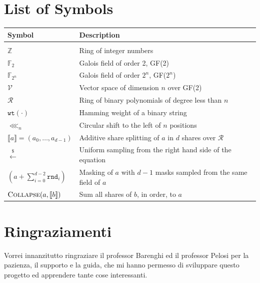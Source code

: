 \documentclass{Configuration_Files/PoliMi3i_thesis}
\theoremstyle{definition}
\theoremstyle{remark}
\newcommand{\sample}{\ensuremath{ \stackrel{\$}{\gets} }}
\newcommand{\ssplit}[1]{\ensuremath{ \llbracket #1 \rrbracket }}
\newcommand{\clshift}{\ensuremath{\lll_n}}
\begin{document}
\listoffigures

\listoftables

\listofalgorithms
\lstlistoflistings

\chapter*{List of Symbols} %
\begin{table}[H]
    \centering
    \begin{tabular}{ll}
        \textbf{Symbol} & \textbf{Description}\\\hline\\[-9px]
        $\mathds{Z}$ & Ring of integer numbers \\[2px]
        $\mathds{F}_2$ & Galois field of order 2, GF(2) \\[2px]
        $\mathds{F}_{2^n}$ & Galois field of order $2^n$, GF($2^n$) \\[2px]
        $\mathcal{V}$ & Vector space of dimension $n$ over GF(2) \\[2px]
        $\mathcal{R}$ & Ring of binary polynomials of degree less than $n$ \\[2px] 
        $\texttt{wt}(\cdot)$ & Hamming weight of a binary string \\[2px]
        $\clshift$ & Circular shift to the left of $n$ positions \\[2px]
        $\ssplit{a} = (a_0,\ldots,a_{d-1})$ & Additive share splitting of $a$ in $d$ shares over $\mathcal{R}$ \\[2px]
        $\sample$ & Uniform sampling from the right hand side of the equation \\[2px]
        $(a+\sum_{i=0}^{d-2} \mathtt{rnd}_i)$ & Masking of $a$ with $d-1$ masks sampled from the same field of $a$ \\[2px]
        $\textsc{Collapse}(a, \ssplit{b})$ & Sum all shares of $b$, in order, to $a$ 
    \end{tabular}
\end{table}

\chapter*{Ringraziamenti}
Vorrei innanzitutto ringraziare il professor Barenghi ed il professor Pelosi per la pazienza, il supporto
e la guida, che mi hanno permesso di sviluppare questo progetto ed apprendere tante cose interessanti.
\end{document}
